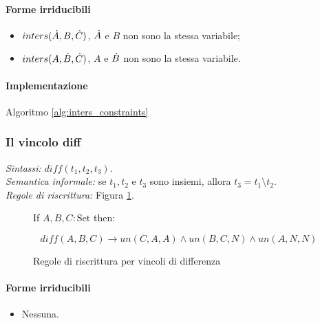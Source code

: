 \documentclass[12pt,a4paper,openright]{book} %
\begin{document}
\paragraph{Forme irriducibili}
\begin{itemize}
	\item $inters(\dot{A}, B, \dot{C})$, $\dot{A}$ e $B$ non sono la stessa variabile;
	\item $inters(A, \dot{B}, \dot{C})$, $A$ e $\dot{B}$ non sono la stessa variabile.
\end{itemize}

\paragraph{Implementazione}
Algoritmo \ref{alg:inters_constraints}

\subsubsection{Il vincolo diff}

\textit{Sintassi:} $diff(t_1,t_2,t_3)$.\\
\noindent\textit{Semantica informale:} se $t_1, t_2$ e $t_3$ sono insiemi, allora $t_3 = t_1 \setminus t_2$.\\
\noindent\textit{Regole di riscrittura:} Figura \ref{fig:difference_constraints}.

\begin{figure}
	\begin{tcolorbox}[colframe=black, colback=white, sharp corners]
		\setcounter{equation}{0}
		\renewcommand{\theequation}{\textsubscript{\arabic{equation}}}
		
		If $A, B, C: \text{Set}$ then:
		
		\begin{equation}
		diff(A,B,C) \to un(C,A,A) \land un(B,C,N) \land un(A,N,N)
		\end{equation}
		
	\end{tcolorbox}
	
	\caption{Regole di riscrittura per vincoli di differenza}
	\label{fig:difference_constraints}
\end{figure}

\paragraph{Forme irriducibili}
\begin{itemize}
	\item Nessuna.
\end{itemize}
\end{document}
